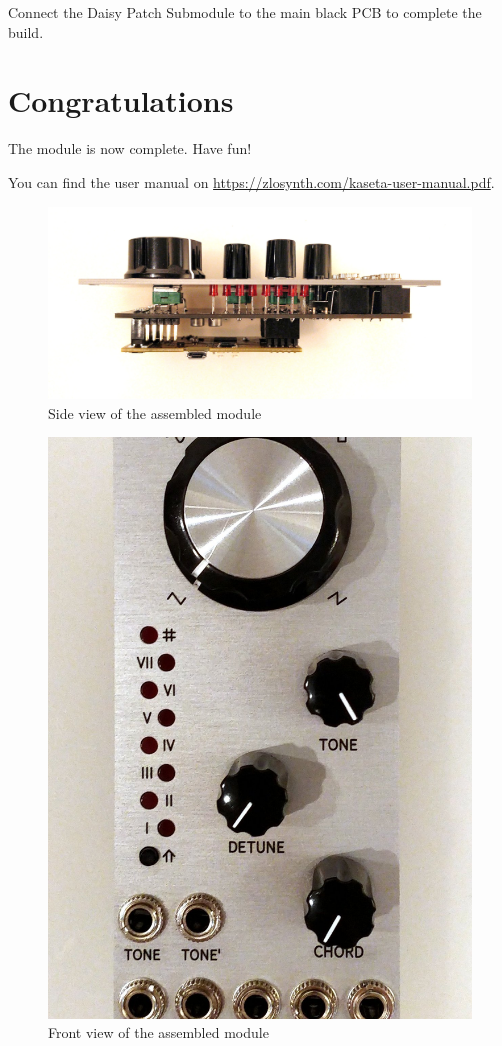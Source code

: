 \documentclass[10pt,a4paper,twocolumn]{article}
\begin{document}
Connect the Daisy Patch Submodule to the main black PCB to complete the build.

\section{Congratulations}

The module is now complete. Have fun!

You can find the user manual on \url{https://zlosynth.com/kaseta-user-manual.pdf}.

\begin{figure}[h]
  \centering
  \includegraphics[width=\linewidth]{p07.jpg}
  \caption{Side view of the assembled module}
\end{figure}

\begin{figure}[h]
  \centering
  \includegraphics[width=\linewidth]{p08.jpg}
  \caption{Front view of the assembled module}
\end{figure}
\end{document}
